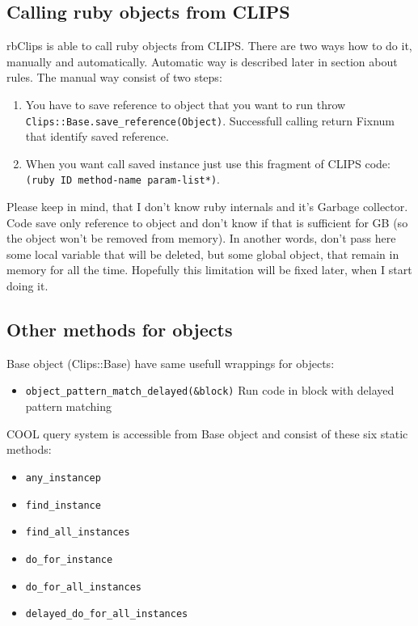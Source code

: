\documentclass[a4paper,10pt]{article}
\begin{document}
\subsection{Calling ruby objects from CLIPS}
rbClips is able to call ruby objects from CLIPS. There are two ways how to do it, manually and automatically. Automatic way is described later in section about rules. The manual way consist of two steps:
\begin{enumerate}
 \item You have to save reference to object that you want to run throw \texttt{Clips::Base.save\_reference(Object)}. Successfull calling return Fixnum that identify saved reference.
 \item When you want call saved instance just use this fragment of CLIPS code: \texttt{(ruby ID method-name param-list*)}.
\end{enumerate}
Please keep in mind, that I don't know ruby internals and it's Garbage collector. Code save only reference to object and don't know if that is sufficient for GB (so the object won't be removed from memory). In another words, don't pass here some local variable that will be deleted, but some global object, that remain in memory for all the time. Hopefully this limitation will be fixed later, when I start doing it.

\subsection{Other methods for objects}
Base object (Clips::Base) have same usefull wrappings for objects:
\begin{itemize}
 \item \texttt{object\_pattern\_match\_delayed(\&block)} Run code in block with delayed pattern matching
\end{itemize}

COOL query system is accessible from Base object and consist of these six static methods:
\begin{itemize}
 \item \texttt{any\_instancep}
 \item \texttt{find\_instance}
 \item \texttt{find\_all\_instances}
 \item \texttt{do\_for\_instance} 
 \item \texttt{do\_for\_all\_instances}
 \item \texttt{delayed\_do\_for\_all\_instances}
\end{itemize}
\end{document}
